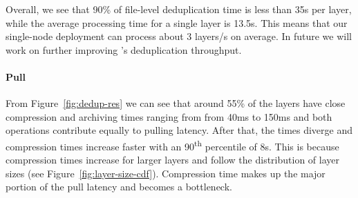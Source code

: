 %
Overall, we see that 90\% of file-level deduplication time is less than 35s
per layer, while the average processing time for a single layer is 13.5s.
%
This means that our single-node deployment can process about 3 layers/s on average.
%
In future we will work on further improving \sysname's deduplication throughput.
%
%

\paragraph{Pull} 

From Figure~\ref{fig:dedup-res}
we can see that around 55\% of the layers have close compression and archiving
times ranging from from 40ms to 150ms and both operations contribute equally
to pulling latency.
%
%
%
After that, the times diverge and compression times increase faster with an
90\textsuperscript{th} percentile of 8s.
%
This is because compression times increase for larger layers and follow the distribution
of layer sizes (see Figure~\ref{fig:layer-size-cdf}).
%
%
Compression time makes up the major portion of the pull latency and becomes a
bottleneck.
%
